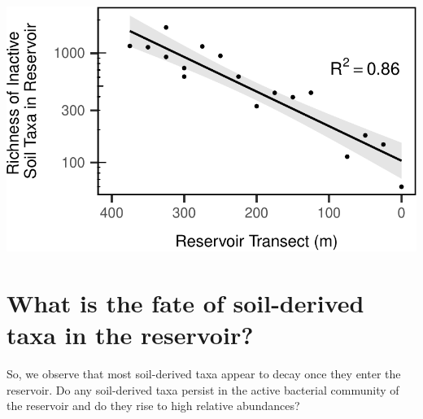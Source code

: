 \documentclass[]{article}
\begin{document}
\begin{center}\includegraphics{ReservoirGradient_files/figure-latex/plot_transient-1} \end{center}

\section{What is the fate of soil-derived taxa in the
reservoir?}\label{what-is-the-fate-of-soil-derived-taxa-in-the-reservoir}

So, we observe that most soil-derived taxa appear to decay once they
enter the reservoir. Do any soil-derived taxa persist in the active
bacterial community of the reservoir and do they rise to high relative
abundances?
\end{document}
